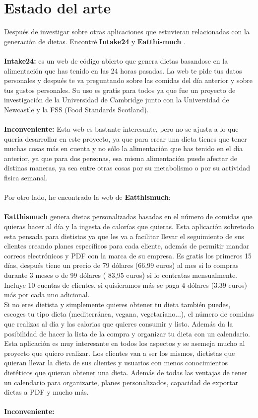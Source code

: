 \chapter{Estado del arte}

Después de investigar sobre otras aplicaciones que estuvieran relacionadas con la generación de dietas. Encontré \textbf{Intake24} \cite{Intake24} y \textbf{Eatthismuch} \cite{Eatthismuch}. 
\\\\
\textbf{Intake24:} es un web de código abierto que genera dietas basandose en la alimentación que has tenido en las 24 horas pasadas.
La web te pide tus datos personales y después te va preguntando sobre las comidas del día anterior y sobre tus gustos personales.
Su uso es gratis para todos ya que fue un proyecto de investigación de la Universidad de Cambridge junto con la Universidad de Newcastle y 
la FSS (Food Standards Scotland).
\\\\
\textbf{Inconveniente:}
Esta web es bastante interesante, pero no se ajusta a lo que quería desarrollar en este proyecto, ya que para crear una dieta tienes que tener muchas cosas más en cuenta y no sólo
la alimentación que has tenido en el día anterior, ya que para dos personas, esa misma alimentación puede afectar de distinas maneras,
ya sea entre otras cosas por su metabolismo o por su actividad fisica semanal.
\\\\
Por otro lado, he encontrado la web de \textbf{Eatthismuch}:
\\\\
\textbf{Eatthismuch} genera dietas personalizadas basadas en el número de comidas que quieras hacer al día y la ingesta de calorías que quieras.
Esta aplicación sobretodo esta pensada para dietistas ya que les va a facilitar llevar el seguimiento de sus clientes creando planes específicos
para cada cliente, además de permitir mandar correos electrónicos y PDF con la marca de su empresa.
Es gratis los primeros 15 días, después tiene un precio de 79 dólares (66,99 euros) al mes si lo compras durante 3 meses o de 99 dólares ( 83,95 euros) si lo contratas mensualmente.
Incluye 10 cuentas de clientes, si quisieramos más se paga 4 dólares (3.39 euros) más por cada uno adicional.\\
Si no eres dietista y simplemente quieres obtener tu dieta también puedes, escoges tu tipo dieta (mediterránea, vegana, vegetariano...), el número de comidas que realizas al día y las calorias que quieres consumir y listo.
Además da la posibilidad de hacer la lista de la compra y organizar tu dieta con un calendario.
Esta aplicación es muy interesante en todos los aspectos y se asemeja mucho al proyecto que quiero realizar. Los clientes van a ser los mismos, dietistas que quieran llevar la dieta de sus clientes
y usuarios con menos conocimientos dietéticos que quieran obtener una dieta. Además de todas las ventajas de tener un calendario para organizarte, planes personalizados, capacidad de exportar dietas a PDF y mucho más.
\\\\
\textbf{Inconveniente:}

